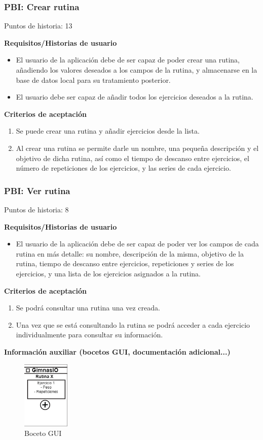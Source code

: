 \documentclass[11pt,a4paper]{report}
\begin{document}
\subsubsection{PBI: Crear rutina}
Puntos de historia: 13
\par\textbf{Requisitos/Historias de usuario}
\begin{itemize}
	\item El usuario de la aplicación debe de ser capaz de poder crear una rutina, añadiendo los valores deseados a los campos de la rutina, y almacenarse en la base de datos local para su tratamiento posterior.
	\item El usuario debe ser capaz de añadir todos los ejercicios deseados a la rutina.
\end{itemize}
\par\textbf{Criterios de aceptación}
\begin{enumerate}
	\item Se puede crear una rutina y añadir ejercicios desde la lista.
	\item Al crear una rutina se permite darle un nombre, una pequeña descripción y el objetivo de dicha rutina, así como el tiempo de descanso entre ejercicios, el número de repeticiones de los ejercicios, y las series de cada ejercicio.
\end{enumerate}
\subsubsection{PBI: Ver rutina}
Puntos de historia: 8
\par\textbf{Requisitos/Historias de usuario}
\begin{itemize}
	\item El usuario de la aplicación debe de ser capaz de poder ver los campos de cada rutina en más detalle: su nombre, descripción de la misma, objetivo de la rutina, tiempo de descanso entre ejercicios, repeticiones y series de los ejercicios, y una lista de los ejercicios asignados a la rutina.
\end{itemize}
\par\textbf{Criterios de aceptación}
\begin{enumerate}
	\item Se podrá consultar una rutina una vez creada.
	\item Una vez que se está consultando la rutina se podrá acceder a cada ejercicio individualmente para consultar su información.
\end{enumerate}
\par\textbf{Información auxiliar (bocetos GUI, documentación adicional...)}
\begin{figure}[H]
	\centering
	\includegraphics[width=0.2\textwidth]{capturicas/guipbiverrutina.png}
	\caption{Boceto GUI}
	\label{fig: guipbi5}
\end{figure}
\end{document}
